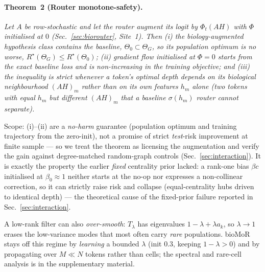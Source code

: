 \documentclass[letterpaper]{article}
\begin{document}
\paragraph{Theorem~2 (Router monotone-safety).}
\emph{Let $A$ be row-stochastic and let the router augment its logit by $\Phi_t(AH)$ with $\Phi$
initialised at $0$ (Sec.~\ref{sec:biorouter}, Site~1). Then (i) the biology-augmented hypothesis
class contains the baseline, $\Theta_0\subset\Theta_G$, so its population optimum is no worse,
$R^\star(\Theta_G)\le R^\star(\Theta_0)$; (ii) gradient flow initialised at $\Phi{=}0$ starts from
the exact baseline loss and is non-increasing in the training objective; and (iii) the inequality
is strict whenever a token's optimal depth depends on its biological neighbourhood $(AH)_m$ rather
than on its own features $h_m$ alone (two tokens with equal $h_m$ but different $(AH)_m$ that a
baseline $\sigma(h_m)$ router cannot separate).}

Scope: (i)--(ii) are a \emph{no-harm} guarantee (population optimum and training trajectory from the
zero-init), not a promise of strict \emph{test}-risk improvement at finite sample --- so we treat the
theorem as licensing the augmentation and verify the gain against degree-matched random-graph controls
(Sec.~\ref{sec:interaction}). It is exactly the property the earlier \emph{fixed} centrality prior
lacked: a rank-one bias $\beta c$ initialised at $\beta_0\!\approx\!1$ neither starts at the no-op nor
expresses a non-collinear correction, so it can strictly raise risk and collapse (equal-centrality
hubs driven to identical depth) --- the theoretical cause of the fixed-prior failure reported
in Sec.~\ref{sec:interaction}.

A low-rank filter can also \emph{over-smooth}: $T_\lambda$ has eigenvalues $1-\lambda+\lambda a_k$, so
$\lambda\to1$ erases the low-variance modes that most often carry \emph{rare} populations. bioMoR
stays off this regime by \emph{learning} a bounded $\lambda$ (init $0.3$, keeping $1-\lambda>0$) and
by propagating over $M{\ll}N$ tokens rather than cells; the spectral and rare-cell analysis is in the
supplementary material.
\end{document}
